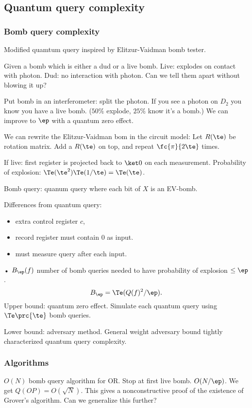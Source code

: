 \subsection{Quantum query complexity}

\subsubsection{Bomb query complexity}

Modified quamtum query inspired by Elitzur-Vaidman bomb tester.

Given a bomb which is either a dud or a live bomb. Live: explodes on contact with photon. Dud: no interaction with photon. Can we tell them apart without blowing it up?

Put bomb in an interferometer: split the photon. If you see a photon on $D_2$ you know you have a live bomb. ($50\%$ explode, $25\%$ know it's a bomb.) %
We can improve to $\ep$ with a quantum zero effect.

We can rewrite the Elitzur-Vaidman bom in the circuit model: 
Let $R(\te)$ be rotation matrix. Add a $R(\te)$ on top, and repeat $\fc{\pi}{2\te}$ times.

If live: first register is projected back to $\ket0$ on each measurement. Probability of explosion: $\Te(\te^2) \Te(1/\te)=\Te(\te)$.

Bomb query: quanum query where each bit of $X$ is an EV-bomb.

Differences from quantum query:
\begin{itemize}
\item
extra control register $c$,
\item
record register must contain $0$ as input.
\item
must measure query after each input.
\end{itemize}•
$B_\ep(f)$ number of bomb queries needed to have probability of explosion $\le \ep$. 
\[
B_\ep=\Te(Q(f)^2/\ep).
\]
Upper bound: quantum zero effect. 
Simulate each quantum query using $\Te\prc{\te}$ bomb queries.

Lower bound: adversary method.
General weight adversary bound tightly characterized quantum query complexity.

\subsubsection{Algorithms}
$O(N)$ bomb query algorithm for OR. Stop at first live bomb. $O(N/\ep)$.
We get $Q(OP)=O(\sqrt N)$. This gives a nonconstructive proof of the existence of Grover's algorithm. Can we generalize this further?


